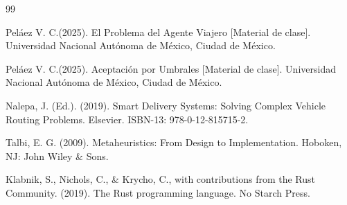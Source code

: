 \begin{thebibliography}{99}

 Peláez V. C.(2025). El Problema del Agente
Viajero [Material de clase]. Universidad Nacional Autónoma de México, Ciudad de México.

 Peláez V. C.(2025). Aceptación por Umbrales [Material de clase]. Universidad Nacional Autónoma de México, Ciudad de México.

 Nalepa, J. (Ed.). (2019). Smart Delivery Systems: Solving Complex Vehicle Routing Problems. Elsevier. ISBN-13: 978-0-12-815715-2.

 Talbi, E. G. (2009). Metaheuristics: From Design to Implementation. Hoboken, NJ: John Wiley \& Sons.

 Klabnik, S., Nichols, C., \& Krycho, C., with contributions from the Rust Community. (2019). The Rust programming language. No Starch Press.
  
\end{thebibliography}
